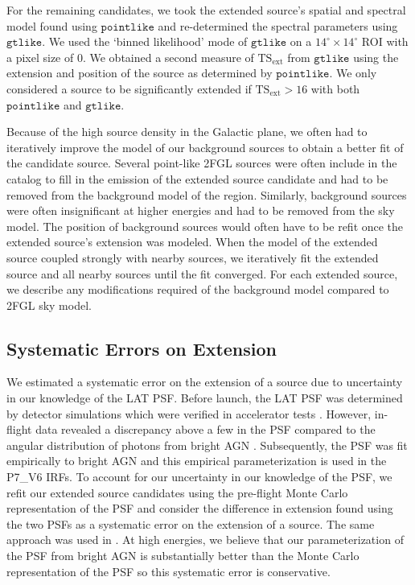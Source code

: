 \documentclass[12pt,preprint]{aastex}
\newcommand{\gev}{\text{GeV}\xspace}
\newcommand{\tsext}{{\ensuremath{\text{TS}_{\text{ext}}}}\xspace}
\newcommand{\gtlike}{\ensuremath{\mathtt{gtlike}}\xspace}
\newcommand{\pointlike}{\ensuremath{\mathtt{pointlike}}\xspace}
\newcommand{\degree}{^\circ\xspace}
\begin{document}
For the remaining candidates, we took the extended source's
spatial and spectral model found
using \pointlike and re-determined the spectral parameters using \gtlike.
We used the `binned likelihood' mode of \gtlike on a $14\degree\times14\degree$
ROI with a pixel size of 0.  We obtained a second measure of \tsext
from \gtlike using the extension and position of the source as determined
by \pointlike.  We only considered a source to be significantly extended
if $\tsext>16$ with both \pointlike and \gtlike.

Because of the high source density in the Galactic plane, we often had
to iteratively improve the model of our background sources to obtain a
better fit of the candidate source.  Several point-like 2FGL sources
were often include in the catalog to fill in the emission of the extended
source candidate and had to be removed from the background model of
the region.  Similarly, background sources were often insignificant at
higher energies and had to be removed from the sky model.  The position
of background sources would often have to be refit once the extended
source's extension was modeled.  When the model of the extended source
coupled strongly with nearby sources, we iteratively fit the extended
source and all nearby sources until the fit converged.  For each extended
source, we describe any modifications required of the background model
compared to 2FGL sky model.

\subsection{Systematic Errors on Extension}
\label{systematic_errors_on_extension}


We estimated a systematic error on the extension of a source due to
uncertainty in our knowledge of the LAT PSF.  Before launch, the LAT PSF
was determined by detector simulations which were verified in accelerator
tests \citep{atwood_LAT_mission}. However, in-flight data revealed
a discrepancy above a few \gev in the PSF compared to the angular
distribution of photons from bright AGN \citep{lat_on_orbit_psf}.
Subsequently, the PSF was fit empirically to bright AGN and this
empirical parameterization is used in the P7\_V6 IRFs.  To account for
our uncertainty in our knowledge of the PSF, we refit our extended source
candidates using the pre-flight Monte Carlo representation of the PSF
and consider the difference in extension found using the two PSFs as a
systematic error on the extension of a source.  The same approach was used
in \cite{ic443}.  At high energies, we believe that our parameterization
of the PSF from bright AGN is substantially better than the Monte Carlo
representation of the PSF so this systematic error is conservative.
\end{document}
